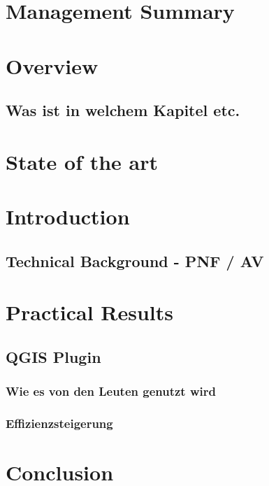     \chapter{Management Summary}
	\chapter{Overview}
		\section{Was ist in welchem Kapitel etc.}
		
	\chapter{State of the art}
	
	\chapter{Introduction}
	\section{Technical Background - PNF / AV}
	
    

	

	

	\chapter{Practical Results}
		\section{QGIS Plugin}
		\subsection{Wie es von den Leuten genutzt wird}
		\subsection{Effizienzsteigerung}
	
	\chapter{Conclusion}

	
    


